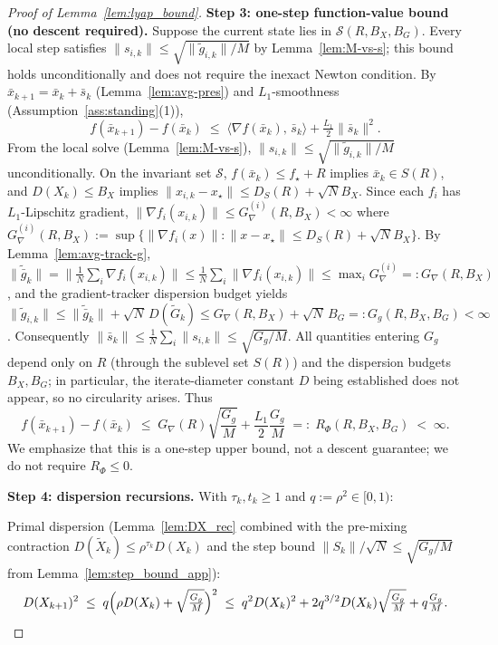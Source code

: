 \documentclass[review,onefignum,onetabnum]{siamart171218}
\begin{document}
\begin{proof}[Proof of Lemma~\ref{lem:lyap_bound}]
\smallskip
\noindent\textbf{Step 3: one-step function-value bound (no descent required).}
Suppose the current state lies in $\mathcal S(R,B_X,B_G)$.
Every local step satisfies $\|s_{i,k}\|\le\sqrt{\|\tilde g_{i,k}\|/M}$
by Lemma~\ref{lem:M-vs-s}; this bound holds unconditionally
and does not require the inexact Newton condition.
By $\bar x_{k+1}=\bar x_k+\bar s_k$ (Lemma~\ref{lem:avg-pres}) and
$L_1$-smoothness (Assumption~\ref{ass:standing}(1)),
\[
  f(\bar x_{k+1})-f(\bar x_k)
  \;\le\;
  \langle \nabla f(\bar x_k),\,\bar s_k\rangle
  +\tfrac{L_1}{2}\|\bar s_k\|^2.
\]
From the local solve (Lemma~\ref{lem:M-vs-s}),
$\|s_{i,k}\|\le\sqrt{\|\tilde g_{i,k}\|/M}$ unconditionally.
On the invariant set $\mathcal S$,
$f(\bar x_k)\le f_\star+R$ implies $\bar x_k\in S(R)$, and
$D(X_k)\le B_X$ implies $\|x_{i,k}-x_\star\|\le D_S(R)+\sqrt{N}B_X$.
Since each $f_i$ has $L_1$-Lipschitz gradient,
$\|\nabla f_i(x_{i,k})\|\le G_\nabla^{(i)}(R,B_X)<\infty$
where $G_\nabla^{(i)}(R,B_X):=\sup\{\|\nabla f_i(x)\|:\|x-x_\star\|\le D_S(R)+\sqrt{N}B_X\}$.
By Lemma~\ref{lem:avg-track-g},
$\|\tilde{\bar g}_k\|=\|\frac1N\sum_i\nabla f_i(x_{i,k})\|
\le \frac1N\sum_i\|\nabla f_i(x_{i,k})\|\le \max_i G_\nabla^{(i)}=:G_\nabla(R,B_X)$,
and the gradient-tracker dispersion budget yields
$\|\tilde g_{i,k}\|\le \|\tilde{\bar g}_k\|+\sqrt{N}\,D(\tilde G_k)
\le G_\nabla(R,B_X)+\sqrt{N}\,B_G=:G_g(R,B_X,B_G)<\infty$.
Consequently $\|\bar s_k\|\le\frac{1}{N}\sum_i\|s_{i,k}\|
\le\sqrt{G_g/M}$.
All quantities entering $G_g$ depend only on $R$ (through the
sublevel set $S(R)$) and the dispersion budgets $B_X,B_G$;
in particular, the iterate-diameter constant $D$ being established
does not appear, so no circularity arises.
Thus
\begin{equation}\label{eq:rphi_R}
  f(\bar x_{k+1})-f(\bar x_k)
  \;\le\;
  G_\nabla(R)\sqrt{\frac{G_g}{M}}+\frac{L_1}{2}\frac{G_g}{M}
  \;=:\; R_\Phi(R,B_X,B_G) \;<\;\infty.
\end{equation}
We emphasize that this is a one-step upper bound, not a descent
guarantee; we do not require $R_\Phi\le 0$.

\smallskip
\noindent\textbf{Step 4: dispersion recursions.}
With $\tau_k,t_k\ge1$ and $q:=\rho^2\in[0,1)$:

Primal dispersion (Lemma~\ref{lem:DX_rec} combined with the
pre-mixing contraction $D(\tilde X_k)\le \rho^{\tau_k}D(X_k)$ and the
step bound $\|S_k\|/\sqrt{N}\le \sqrt{G_g/M}$ from
Lemma~\ref{lem:step_bound_app}):
\[
  D(X_{k+1})^2
  \;\le\; q\Bigl(\rho D(X_k)+\sqrt{\tfrac{G_g}{M}}\Bigr)^2
  \;\le\; q^2 D(X_k)^2 + 2q^{3/2}D(X_k)\sqrt{\tfrac{G_g}{M}}+q\tfrac{G_g}{M}.
\]


\end{proof}
\end{document}
